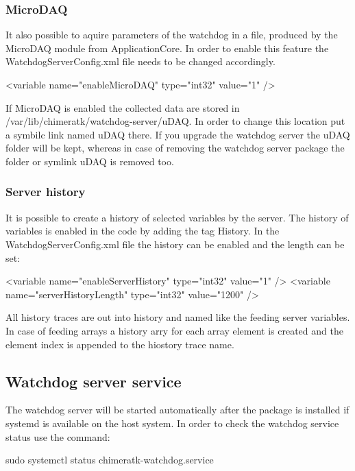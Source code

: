 \subsubsection*{Micro\+D\+AQ}

It also possible to aquire parameters of the watchdog in a file, produced by the {\ttfamily Micro\+D\+AQ} module from {\ttfamily Application\+Core}. In order to enable this feature the {\ttfamily Watchdog\+Server\+Config.\+xml} file needs to be changed accordingly. \begin{DoxyVerb}<variable name="enableMicroDAQ" type="int32" value="1" />
\end{DoxyVerb}


If Micro\+D\+AQ is enabled the collected data are stored in {\ttfamily /var/lib/chimeratk/watchdog-\/server/u\+D\+AQ}. In order to change this location put a symbilc link named {\ttfamily u\+D\+AQ} there. If you upgrade the watchdog server the u\+D\+AQ folder will be kept, whereas in case of removing the watchdog server package the folder or symlink {\ttfamily u\+D\+AQ} is removed too.

\subsubsection*{Server history}

It is possible to create a history of selected variables by the server. The history of variables is enabled in the code by adding the tag {\ttfamily History}. In the {\ttfamily Watchdog\+Server\+Config.\+xml} file the history can be enabled and the length can be set\+: \begin{DoxyVerb}<variable name="enableServerHistory" type="int32" value="1" />
<variable name="serverHistoryLength" type="int32" value="1200" /> 
\end{DoxyVerb}


All history traces are out into {\ttfamily history} and named like the feeding server variables. In case of feeding arrays a history arry for each array element is created and the element index is appended to the hiostory trace name.

\subsection*{Watchdog server service}

The watchdog server will be started automatically after the package is installed if systemd is available on the host system. In order to check the watchdog service status use the command\+: \begin{DoxyVerb}sudo systemctl status chimeratk-watchdog.service
\end{DoxyVerb}


